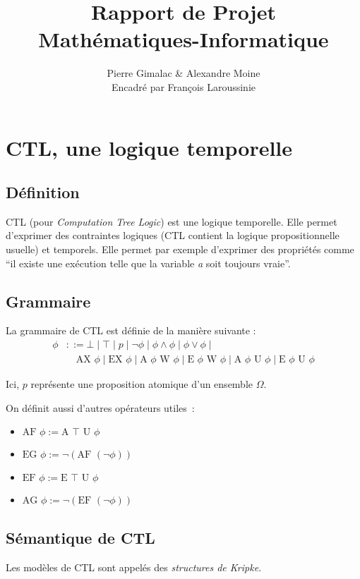 \documentclass[10pt,a4paper]{article}
\author{Pierre Gimalac \& Alexandre Moine\\\small{Encadré par François Laroussinie}}
\title{Rapport de Projet\\Mathématiques-Informatique}
\begin{document}
\maketitle

\section{CTL, une logique temporelle}
\subsection{Définition}
CTL (pour \textit{Computation Tree Logic}) est une logique temporelle. Elle permet d'exprimer des contraintes logiques (CTL contient la logique propositionnelle usuelle) et temporels.
Elle permet par exemple d'exprimer des propriétés comme ``il existe une exécution telle que la variable \textit{a} soit toujours vraie''.

\subsection{Grammaire}
\label{op}
La grammaire de CTL est définie de la manière suivante :
\begin{align*}
\phi &::= \bot \mid \top \mid p \mid \neg \phi \mid \phi\land\phi \mid \phi\lor\phi \mid \\
&\quad \mbox{AX }\phi \mid \mbox{EX }\phi \mid
\mbox{A }\phi \mbox{ W } \phi \mid \mbox{E }\phi \mbox{ W } \phi \mid
\mbox{A }\phi \mbox{ U } \phi \mid \mbox{E }\phi \mbox{ U } \phi
\end{align*}

Ici, $p$ représente une proposition atomique d'un ensemble $\Omega$.

On définit aussi d'autres opérateurs utiles :
\begin{itemize}
	\item $\mbox{AF } \phi := \mbox{A } \top \mbox{ U } \phi$
	\item $\mbox{EG } \phi := \neg (\mbox{AF } (\neg \phi))$
	\item $\mbox{EF } \phi := \mbox{E } \top \mbox{ U } \phi$
	\item $\mbox{AG } \phi := \neg (\mbox{EF } (\neg \phi))$
\end{itemize}

\subsection{Sémantique de CTL}
Les modèles de CTL sont appelés des \emph{structures de Kripke}.
\end{document}
